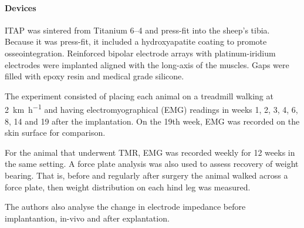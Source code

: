 \paragraph{Devices}
ITAP was sintered from Titanium 6--4 and press-fit into the sheep's tibia. Because it was press-fit, it included a hydroxyapatite coating to promote osseointegration.
Reinforced bipolar electrode arrays with platinum-iridium electrodes were implanted aligned with the long-axis of the muscles.
Gaps were filled with epoxy resin and medical grade silicone.

The experiment consisted of placing each animal on a treadmill walking at \SI{2}{\kilo\metre\per\hour} and having electromyographical (EMG) readings in weeks 1, 2, 3, 4, 6, 8, 14 and 19 after the implantation.
On the 19th week, EMG was recorded on the skin surface for comparison.

For the animal that underwent TMR, EMG was recorded weekly for 12 weeks in the same setting.
A force plate analysis was also used to assess recovery of weight bearing.
That is, before and regularly after surgery the animal walked across a force plate, then weight distribution on each hind leg was measured.

The authors also analyse the change in electrode impedance before implantantion, in-vivo and after explantation.